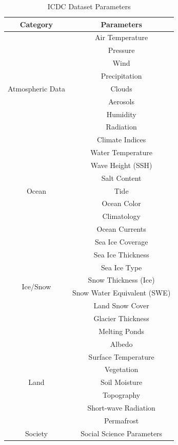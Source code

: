 \begin{table}[ht]
    \footnotesize
    \centering
    \begin{tabular}{|c|c|}
        \hline
        \textbf{Category} & \textbf{Parameters} \\
        \hline
        \multirow{9}{*}{Atmospheric Data} & Air Temperature \\
        & Pressure \\
        & Wind \\
        & Precipitation \\
        & Clouds \\
        & Aerosols \\
        & Humidity \\
        & Radiation \\
        & Climate Indices \\
        \hline
        \multirow{7}{*}{Ocean} & Water Temperature \\
        & Wave Height (SSH) \\
        & Salt Content \\
        & Tide \\
        & Ocean Color \\
        & Climatology \\
        & Ocean Currents \\
        \hline
        \multirow{8}{*}{Ice/Snow} & Sea Ice Coverage \\
        & Sea Ice Thickness \\
        & Sea Ice Type \\
        & Snow Thickness (Ice) \\
        & Snow Water Equivalent (SWE) \\
        & Land Snow Cover \\
        & Glacier Thickness \\
        & Melting Ponds \\
        \hline
        \multirow{7}{*}{Land} & Albedo \\
        & Surface Temperature \\
        & Vegetation \\
        & Soil Moisture \\
        & Topography \\
        & Short-wave Radiation \\
        & Permafrost \\
        \hline
        \multirow{1}{*}{Society} & Social Science Parameters \\
        \hline
    \end{tabular}
    \caption{ICDC Dataset Parameters}
    \label{tab:icdc datset parameters}
\end{table}

